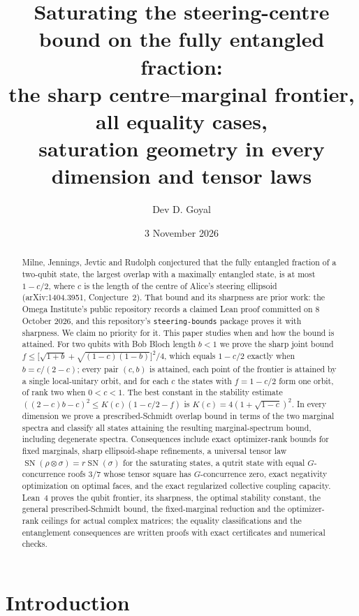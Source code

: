 \documentclass[11pt,a4paper]{article}
\title{Saturating the steering-centre bound on the fully entangled fraction:\\[4pt]
\large the sharp centre--marginal frontier, all equality cases,\\
saturation geometry in every dimension and tensor laws}
\author{Dev D. Goyal}
\date{3 November 2026}
\theoremstyle{remark}\newtheorem{remark}[theorem]{Remark}
\begin{document}
\maketitle
\begin{abstract}
Milne, Jennings, Jevtic and Rudolph conjectured that the fully entangled
fraction of a two-qubit state, the largest overlap with a maximally
entangled state, is at most $1-c/2$, where $c$ is the length of the centre
of Alice's steering ellipsoid (arXiv:1404.3951, Conjecture~2). That bound and
its sharpness are prior work: the Omega Institute's public repository records
a claimed Lean proof committed on 8 October 2026, and this repository's
\texttt{steering-bounds} package proves it with sharpness. We claim no
priority for it. This paper studies when and how the bound is attained.
For two qubits with Bob Bloch length $b<1$ we prove the sharp joint bound
$f\le\bigl[\sqrt{1+b}+\sqrt{(1-c)(1-b)}\bigr]^2/4$, which equals $1-c/2$
exactly when $b=c/(2-c)$; every pair $(c,b)$ is attained, each point of the
frontier is attained by a single local-unitary orbit, and for each $c$ the
states with $f=1-c/2$ form one orbit, of rank two when $0<c<1$. The best
constant in the stability estimate $((2-c)b-c)^2\le K(c)(1-c/2-f)$ is
$K(c)=4(1+\sqrt{1-c})^2$. In every dimension we prove a prescribed-Schmidt
overlap bound in terms of the two marginal spectra and classify all states
attaining the resulting marginal-spectrum bound, including degenerate
spectra. Consequences include exact optimizer-rank bounds for fixed
marginals, sharp ellipsoid-shape refinements, a universal tensor law
$\operatorname{SN}(\rho\otimes\sigma)=r\operatorname{SN}(\sigma)$ for the
saturating states, a qutrit state with equal $G$-concurrence roofs $3/7$
whose tensor square has $G$-concurrence zero, exact negativity optimization
on optimal faces, and the exact regularized collective coupling capacity.
Lean~4 proves the qubit frontier, its sharpness, the optimal stability
constant, the general prescribed-Schmidt bound, the fixed-marginal reduction
and the optimizer-rank ceilings for actual complex matrices; the equality
classifications and the entanglement consequences are written proofs with
exact certificates and numerical checks.
\end{abstract}
\newpage
\tableofcontents
\newpage

\section{Introduction}\label{sec:intro}
\end{document}
